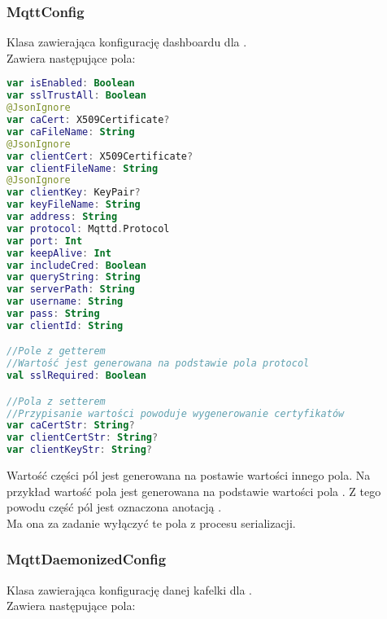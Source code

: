 \newpage

\subsubsection{MqttConfig}
Klasa zawierająca konfigurację dashboardu dla .\\
Zawiera następujące pola:

\begin{lstlisting}[language=Kotlin]
var isEnabled: Boolean
var sslTrustAll: Boolean
@JsonIgnore
var caCert: X509Certificate?
var caFileName: String
@JsonIgnore
var clientCert: X509Certificate?
var clientFileName: String
@JsonIgnore
var clientKey: KeyPair?
var keyFileName: String
var address: String
var protocol: Mqttd.Protocol
var port: Int
var keepAlive: Int
var includeCred: Boolean
var queryString: String
var serverPath: String
var username: String
var pass: String
var clientId: String

//Pole z getterem
//Wartość jest generowana na podstawie pola protocol
val sslRequired: Boolean

//Pola z setterem
//Przypisanie wartości powoduje wygenerowanie certyfikatów 
var caCertStr: String?
var clientCertStr: String?
var clientKeyStr: String?
\end{lstlisting}

Wartość części pól jest generowana na postawie wartości innego pola. Na przykład wartość pola  jest generowana na podstawie wartości pola . Z tego powodu część pól jest oznaczona anotacją .\\
Ma ona za zadanie wyłączyć te pola z procesu serializacji.

\newpage

\subsubsection{MqttDaemonizedConfig}
Klasa zawierająca konfigurację danej kafelki dla .\\
Zawiera następujące pola:

